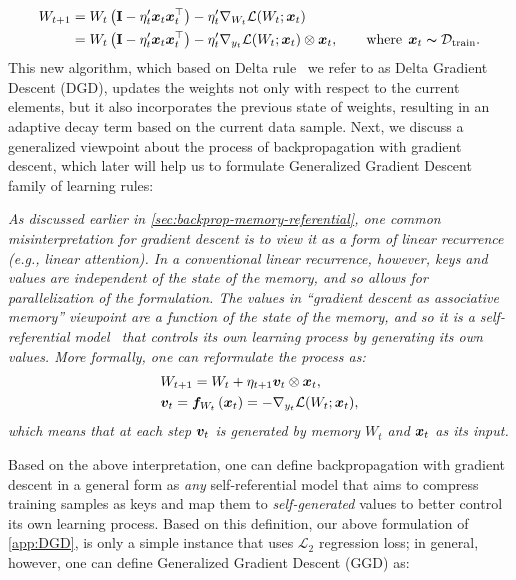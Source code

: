 {\begin{align} \nonumber
    W_{t+1} &= W_{t} \left( \mathbf{I} -\eta'_t\boldsymbol{x}_t\boldsymbol{x}_t^{\top}\right) - \eta_{t}' \nabla_{W_t} \mathcal{L}(W_t;\boldsymbol{x}_t) \\ \label{eq:DGD}
    &= W_{t} \left( \mathbf{I} -\eta'_t\boldsymbol{x}_t \boldsymbol{x}_t^{\top}\right) - \eta_{t}' \nabla_{y_t} \mathcal{L}(W_t; \boldsymbol{x}_t) \otimes \boldsymbol{x}_t, \qquad \text{where}\:\: \boldsymbol{x}_t \thicksim \mathcal{D}_{\text{train}}.
\end{align}
This new algorithm, which based on Delta rule~\citep{prados1989neural} we refer to as Delta Gradient Descent (DGD), updates the weights not only with respect to the current elements, but it also incorporates the previous state of weights, resulting in an adaptive decay term based on the current data sample. Next, we discuss a generalized viewpoint about the process of backpropagation with gradient descent, which later will help us to formulate Generalized Gradient Descent family of learning rules:

\vspace{8pt}
 \begin{myboxi}
     \textit{As discussed earlier in \autoref{sec:backprop-memory-referential}, one common misinterpretation for gradient descent is to view it as a form of linear recurrence (e.g., linear attention). In a conventional linear recurrence, however, keys and values are independent of the state of the memory, and so allows for parallelization of the formulation. The values in ``gradient descent as associative memory'' viewpoint are a function of the state of the memory, and so it is a self-referential model~\citep{schmidhuber1993self} that controls its own learning process by generating its own values. More formally, one can reformulate the process as: }
\begin{align}
    &W_{t+1} =  W_{t} + \eta_{t+1} \boldsymbol{v}_t \otimes \boldsymbol{x}_t,\\ \nonumber
    &\boldsymbol{v}_t = \boldsymbol{f}_{W_t}\left(\boldsymbol{x}_t \right) = - \nabla_{y_t} \mathcal{L}(W_t;\boldsymbol{x}_t),
\end{align}
\textit{which means that at each step $\boldsymbol{v}_t$ is generated by memory $W_t$ and $\boldsymbol{x}_t$ as its input.}
 \end{myboxi}

Based on the above interpretation, one can define backpropagation with gradient descent in a general form as \emph{any} self-referential model that aims to compress training samples as keys and map them to \emph{self-generated} values to better control its own learning process. Based on this definition, our above formulation of \autoref{app:DGD}, is only a simple instance that uses $\mathcal{L}_2$ regression loss; in general, however, one can define Generalized Gradient Descent (GGD) as: 

}
